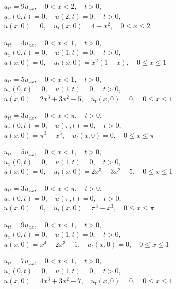 \begin{exerciselist}
  \item\label{exer:12.2.20} $u_{tt}=9u_{xx},\quad0<x<2,\quad t>0$,\\ $u_{x}(0,t)=0,\quad u(2,t)=0,\quad t>0$,\\ $u(x,0)=0,\quad u_{t}(x,0)=4-x^{2},\quad0\le x\le2$

  \item\label{exer:12.2.21} $u_{tt}=4u_{xx},\quad0<x<1,\quad t>0$,\\ $u_{x}(0,t)=0,\quad u(1,t)=0,\quad t>0$,\\ $u(x,0)=0,\quad u_{t}(x,0)=x^{2}(1-x),\quad0\le x\le1$

  \item\label{exer:12.2.22} \Cex $u_{tt}=5u_{xx},\quad0<x<1,\quad t>0$,\\ $u_{x}(0,t)=0,\quad u(1,t)=0,\quad t>0$,\\ $u(x,0)=2x^{3}+3x^{2}-5,\quad u_{t}(x,0)=0,\quad0\le x\le1$

  \item\label{exer:12.2.23} $u_{tt}=3u_{xx},\quad0<x<\pi,\quad t>0$,\\ $u_{x}(0,t)=0,\quad u(\pi,t)=0,\quad t>0$,\\ $u(x,0)=\pi^{3}-x^{3},\quad u_{t}(x,0)=0,\quad0\le x\le\pi$

  \item\label{exer:12.2.24} $u_{tt}=5u_{xx},\quad0<x<1,\quad t>0$,\\ $u_{x}(0,t)=0,\quad u(1,t)=0,\quad t>0$,\\ $u(x,0)=0,\quad u_{t}(x,0)=2x^{3}+3x^{2}-5,\quad0\le x\le1$

  \item\label{exer:12.2.25} \Cex $u_{tt}=3u_{xx},\quad0<x<\pi,\quad t>0$,\\ $u_{x}(0,t)=0,\quad u(\pi,t)=0,\quad t>0$,\\ $u(x,0)=0,\quad u_{t}(x,0)=\pi^{3}-x^{3},\quad0\le x\le\pi$

  \item\label{exer:12.2.26} $u_{tt}=9u_{xx},\quad0<x<1,\quad t>0$,\\ $u_{x}(0,t)=0,\quad u(1,t)=0,\quad t>0$,\\ $u(x,0)=x^{4}-2x^{3}+1,\quad u_{t}(x,0)=0,\quad0\le x\le1$

  \item\label{exer:12.2.27} $u_{tt}=7u_{xx},\quad0<x<1,\quad t>0$,\\ $u_{x}(0,t)=0,\quad u(1,t)=0,\quad t>0$,\\ $u(x,0)=4x^{3}+3x^{2}-7,\quad u_{t}(x,0)=0,\quad0\le x\le1$


\end{exerciselist}
